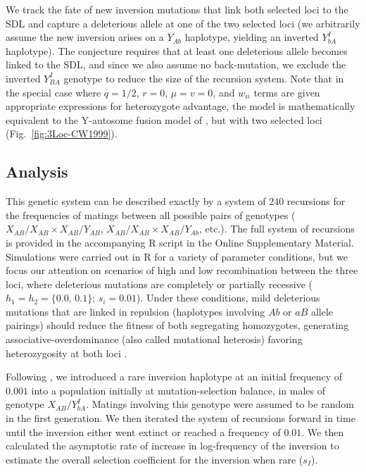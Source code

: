 \documentclass{article}
\begin{document}
\begin{appendices}
We track the fate of new inversion mutations  that link both selected loci to the SDL and capture a deleterious allele at one of the two selected loci (we arbitrarily assume the new inversion arises on a $Y_{Ab}$ haplotype, yielding an inverted $Y_{bA}^I$ haplotype). The conjecture requires that at least one deleterious allele becomes linked to the SDL, and since we also assume no back-mutation, we exclude the inverted $Y_{BA}^I$ genotype to reduce the size of the recursion system. Note that in the special case where $q = 1/2$, $r = 0$, $\mu = v = 0$, and $w_{ii}$ terms are given appropriate expressions for heterozygote advantage, the model is mathematically equivalent to the Y-autosome fusion model of \citet{CharlesworthWall1999}, but with two selected loci (Fig.~\ref{fig:3Loc-CW1999}).

\subsection{Analysis}

This genetic system can be described exactly by a system of $240$ recursions for the frequencies of matings between all possible pairs of genotypes ($X_{AB}/X_{AB} \times X_{AB}/Y_{AB}$, $X_{AB}/X_{AB} \times X_{AB}/Y_{Ab}$, etc.). The full system of recursions is provided in the accompanying R script in the Online Supplementary Material. Simulations were carried out in R \citep{RSoftware} for a variety of parameter conditions, but we focus our attention on scenarios of high and low recombination between the three loci, where deleterious mutations are completely or partially recessive ($h_1 = h_2 = \{0.0,\, 0.1\}$; $s_i = 0.01$). Under these conditions, mild deleterious mutations that are linked in repulsion (haplotypes involving $Ab$ or $aB$ allele pairings) should reduce the fitness of both segregating homozygotes, generating associative-overdominance (also called mutational heterosis) favoring heterozygosity at both loci \citep{Ohta1971a, Waller2021}.

Following \citet{CharlesworthWall1999}, we introduced a rare inversion haplotype at an initial frequency of $0.001$ into a population initially at mutation-selection balance, in males of genotype $X_{AB}/Y_{bA}^I$. Matings involving this genotype were assumed to be random in the first generation. We then iterated the system of recursions forward in time until the inversion either went extinct or reached a frequency of $0.01$. We then calculated the asymptotic rate of increase in log-frequency of the inversion to estimate the overall selection coefficient for the inversion when rare ($s_I$). 


\end{appendices}
\end{document}
